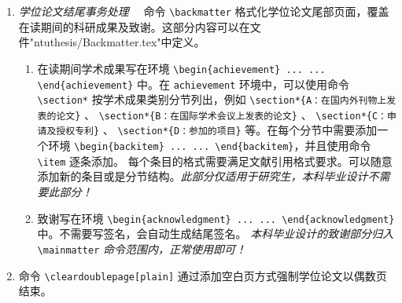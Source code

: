 \begin{enumerate}
\begin{enumerate}
    \item 命令 \verb|\appendix| 重定义附录章节计数格式，并初始化各个计数器。附录各个章节内容可以定义在文件"ntuthesis/Appendix.tex"中。
    \end{enumerate}
    \item \emph{学位论文结尾事务处理}~~ 命令 \verb|\backmatter| 格式化学位论文尾部页面，覆盖在读期间的科研成果及致谢。这部分内容可以在文件"ntuthesis/Backmatter.tex"中定义。
        \begin{enumerate}
        \item  在读期间学术成果写在环境 \verb|\begin{achievement} ... ... \end{achievement}| 中。在 \verb|achievement| 环境中，可以使用命令 \verb|\section*| 按学术成果类别分节列出，例如 \verb|\section*{A：在国内外刊物上发表的论文}| 、 \verb|\section*{B：在国际学术会议上发表的论文}| 、 \verb|\section*{C：申请及授权专利}| 、 \verb|\section*{D：参加的项目}| 等。在每个分节中需要添加一个环境 \verb|\begin{backitem} ... ... \end{backitem}|，并且使用命令 \verb|\item| 逐条添加。 每个条目的格式需要满足文献引用格式要求。可以随意添加新的条目或是分节结构。\emph{此部分仅适用于研究生，本科毕业设计不需要此部分！}
        \item 致谢写在环境 \verb|\begin{acknowledgment} ... ... \end{acknowledgment}| 中。不需要写签名，会自动生成结尾签名。
        \emph{本科毕业设计的致谢部分归入} \verb|\mainmatter| \emph{命令范围内，正常使用即可！}
        \end{enumerate}
        
    \item 命令 \verb|\cleardoublepage[plain]| 通过添加空白页方式强制学位论文以偶数页结束。 
\end{enumerate}
